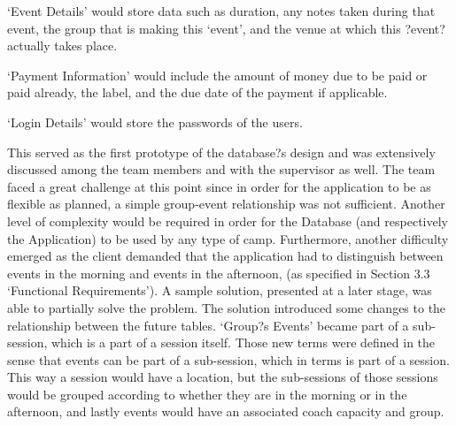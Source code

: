 \documentclass{l3proj}
\begin{document}
\par
`Event Details' would store data such as duration, any notes taken during that event, the group that is making this `event', and the venue at which this ?event? actually takes place.\\
\par
`Payment Information' would include the amount of money due to be paid or paid already, the label, and the due date of the payment if applicable.\\
\par
`Login Details' would store the passwords of the users.\\
\par
This served as the first prototype of the database?s design and was extensively discussed among the team members and with the supervisor as well. The team faced a great challenge at this point since in order for the application to be as flexible as planned, a simple group-event relationship was not sufficient. Another level of complexity would be required in order for the Database (and respectively the Application) to be used by any type of camp. Furthermore, another difficulty emerged as the client demanded that the application had to distinguish between events in the morning and events in the afternoon, (as specified in Section 3.3 `Functional Requirements'). A sample solution, presented at a later stage, was able to partially solve the problem. The solution introduced some changes to the relationship between the future tables. `Group?s Events' became part of a sub-session, which is a part of a session itself. Those new terms were defined in the sense that events can be part of a sub-session, which in terms is part of a session. This way a session would have a location, but the sub-sessions of those sessions would be grouped according to whether they are in the morning or in the afternoon, and lastly events would have an associated coach capacity and group.\\
\end{document}
